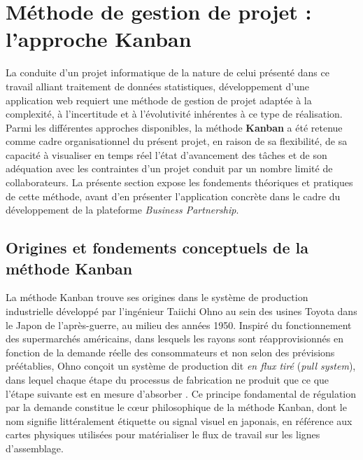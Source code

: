 	\section{Méthode de gestion de projet : l'approche Kanban}
\label{sec:kanban}

La conduite d'un projet informatique de la nature de celui présenté
dans ce travail alliant traitement de données statistiques,
développement d'une application web requiert une méthode de gestion de projet adaptée
à la complexité, à l'incertitude et à l'évolutivité inhérentes à ce
type de réalisation. Parmi les différentes approches disponibles,
la méthode \textbf{Kanban} a été retenue comme cadre organisationnel
du présent projet, en raison de sa flexibilité, de sa capacité à
visualiser en temps réel l'état d'avancement des tâches et de son
adéquation avec les contraintes d'un projet conduit par un nombre
limité de collaborateurs. La présente section expose les fondements
théoriques et pratiques de cette méthode, avant d'en présenter
l'application concrète dans le cadre du développement de la
plateforme \textit{Business Partnership}.

\subsection{Origines et fondements conceptuels de la méthode Kanban}
\label{subsec:kanban_origines}

La méthode Kanban trouve ses origines dans le système de production
industrielle développé par l'ingénieur Taiichi Ohno au sein des
usines Toyota dans le Japon de l'après-guerre, au milieu des années
1950. Inspiré du fonctionnement des supermarchés américains, dans
lesquels les rayons sont réapprovisionnés en fonction de la demande
réelle des consommateurs et non selon des prévisions préétablies,
Ohno conçoit un système de production dit \textit{en flux tiré}
(\textit{pull system}), dans lequel chaque étape du processus de
fabrication ne produit que ce que l'étape suivante est en mesure
d'absorber \cite{ohno_1988}. Ce principe fondamental de régulation
par la demande constitue le c\oe ur philosophique de la méthode
Kanban, dont le nom signifie littéralement \og{}étiquette\fg{} ou
\og{}signal visuel\fg{} en japonais, en référence aux cartes physiques
utilisées pour matérialiser le flux de travail sur les lignes
d'assemblage.

